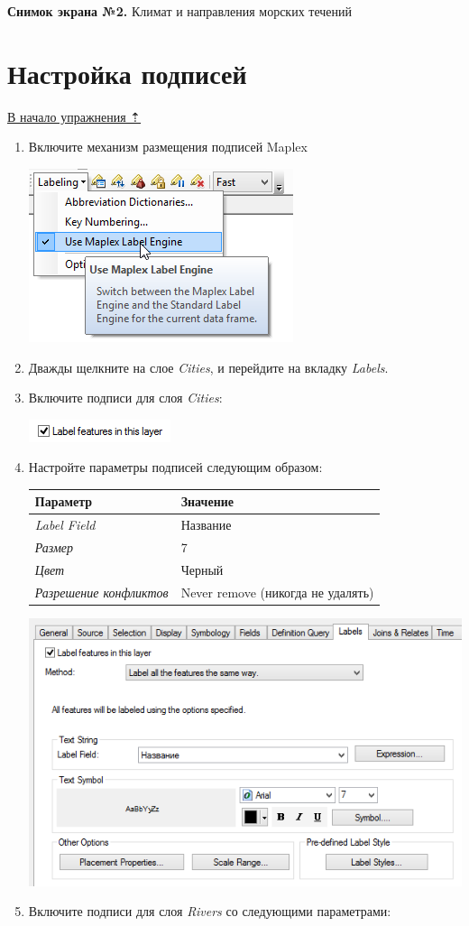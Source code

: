 \documentclass[12pt,]{book}
\begin{document}
\textbf{Снимок экрана №2.} Климат и направления морских течений

\hypertarget{map-design-climates-labels}{%
\section{Настройка подписей}\label{map-design-climates-labels}}

\protect\hyperlink{map-design-climates}{В начало упражнения ⇡}

\begin{enumerate}
\def\labelenumi{\arabic{enumi}.}
\item
  Включите механизм размещения подписей Maplex

  \includegraphics{images/Ex03/image26.png}
\item
  Дважды щелкните на слое \emph{Cities}, и перейдите на вкладку \emph{Labels}.
\item
  Включите подписи для слоя \emph{Cities}:

  \includegraphics{images/Ex03/image27.png}
\item
  Настройте параметры подписей следующим образом:

  \begin{longtable}[]{@{}ll@{}}
  \toprule
  \textbf{Параметр} & \textbf{Значение}\tabularnewline
  \midrule
  \endhead
  \emph{Label Field} & Название\tabularnewline
  \emph{Размер} & 7\tabularnewline
  \emph{Цвет} & Черный\tabularnewline
  \emph{Разрешение конфликтов} & Never remove (никогда не удалять)\tabularnewline
  \bottomrule
  \end{longtable}

  \includegraphics{images/Ex03/image28.png}
\item
  Включите подписи для слоя \emph{Rivers} со следующими параметрами:


\end{enumerate}
\end{document}

